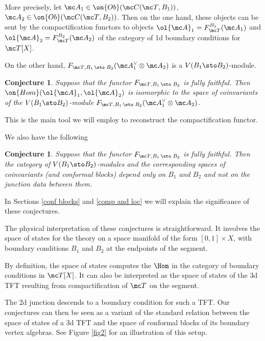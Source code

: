 \documentclass[11pt,reqno]{amsart}
\theoremstyle{plain}
\newtheorem{conj}[theorem]{Conjecture}
\numberwithin{equation}{section}
\theoremstyle{definition}
\begin{document}
More precisely, let ${\mc A}_1 \in \on{Ob}({\mc C}({\mc T},B_1))$,
${\mc A}_2 \in \on{Ob}({\mc C}({\mc T},B_2))$. Then on the one hand,
these objects can be sent by the compactification functors to objects
$\ol{\mc A}_1 = F_{\mc T}^{B_1}({\mc A_1})$ and $\ol{\mc A}_2 = F_{\mc
  T}^{B_2}({\mc A_2})$ of the category of 1d boundary conditions for
${\mc T}[X]$.
  
On the other hand, $F_{{\mc T},B_1 \, \sto \; B_2}({\mc A}_1^\vee
\otimes{\mc A}_2)$ is a $V(B_1\sto B_2)$-module.

\begin{conj}    \label{Hom and conf}
Suppose that the functor $F_{{\mc T},B_1\, \sto \; B_2}$ is fully
faithful. Then $\on{Hom}(\ol{\mc A}_1,\ol{\mc A}_2)$ is
isomorphic to the space of coinvariants of the $V(B_1\sto B_2)$-module
$F_{{\mc T},B_1 \, \sto \; B_2}({\mc A}_1^\vee \otimes {\mc A}_2)$.
\end{conj}

This is the main tool we will employ to reconstruct the 
compactification functor.

We also have the following

\begin{conj}    \label{meta}
  Suppose that the functor $F_{{\mc T},B_1\, \sto \; B_2}$ is fully
  faithful. Then the category of $V(B_1\sto B_2)$-modules and
  the corresponding spaces of coinvariants (and conformal blocks)
  depend only on $B_1$ and $B_2$ and not on the junction data between
  them.
\end{conj}

In Sections \ref{conf blocks} and \ref{comp and loc} we will explain
the significance of these conjectures.

The physical interpretation of these conjectures is
straightforward. It involves the space of states for the theory on a
space manifold of the form $ [0,1] \times X$, with boundary conditions
$B_1$ and $B_2$ at the endpoints of the segment.

By definition, the space of states computes the $\Hom$ in the category
of boundary conditions in ${\mc T}[X]$. It can also be interpreted as
the space of states of the 3d TFT resulting from compactification of
${\mc T}$ on the segment.

The 2d junction descends to a boundary condition for such a TFT.  Our
conjectures can then be seen as a variant of the standard relation
between the space of states of a 3d TFT and the space of conformal
blocks of its boundary vertex algebras. See Figure \ref{fig2} for an
illustration of this setup.
\end{document}
